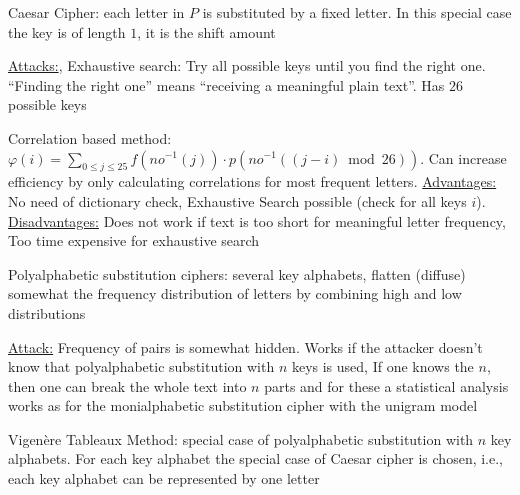 \documentclass[landscape, a4paper]{article}
\begin{document}
\begin{minipage}[t]{0.2\linewidth}
\begin{betterlist}
\begin{betterlist}
\begin{betterlist}
			\end{betterlist}
			\begin{betterlist}
				\item \alert{Caesar Cipher:} each letter in $P$ is substituted by a fixed letter. In this special case the \alert{key} is of length $1$, it is the shift amount
				\begin{betterlist}
					\item \underline{Attacks:}, \alert{Exhaustive search:} Try all possible keys until you find the right one. \enquote{Finding the right one} means \enquote{receiving a meaningful plain text}. Has $26$ possible keys \item \alert{Correlation based method:} $\varphi(i)=\sum_{0 \leq j \leq 25} f\left(n o^{-1}(j)\right) \cdot p\left(n o^{-1}((j-i) \bmod 26)\right)$. Can increase efficiency by only calculating correlations for most frequent letters. \underline{Advantages:} No need of dictionary check, Exhaustive Search possible (check for all keys $i$). \underline{Disadvantages:} Does not work if text is too short for meaningful letter frequency, Too time expensive for exhaustive search
				\end{betterlist}
			\end{betterlist}
		\end{betterlist}
		\begin{betterlist}
			\item \alert{Polyalphabetic substitution ciphers:} several key alphabets, flatten (diffuse) somewhat the frequency distribution of letters by combining high and low distributions
			\begin{betterlist}
				\item \underline{Attack:} Frequency of pairs is somewhat hidden. Works if the attacker doesn't know that polyalphabetic substitution with $n$ keys is used, If one knows the $n$, then one can break the whole text into $n$ parts and for these a \alert{statistical analysis} works as for the monialphabetic substitution cipher with the unigram model
			\end{betterlist}
			\begin{betterlist}
				\item \alert{Vigenère Tableaux Method:} special case of polyalphabetic substitution with $n$ key alphabets. For each key alphabet the special case of Caesar cipher is chosen, i.e., each key alphabet can be represented by one letter%

\end{betterlist}
\end{betterlist}
\end{betterlist}
\end{minipage}
\end{document}
